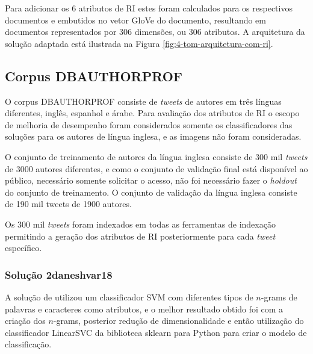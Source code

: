 				

				Para adicionar os 6 atributos de RI estes foram calculados para os respectivos documentos e embutidos no vetor GloVe do documento, resultando em documentos representados por 306 dimensões, ou 306 atributos.
				A arquitetura da solução adaptada está ilustrada na Figura \ref{fig:4-tom-arquitetura-com-ri}.

		\subsection{Corpus DB\underscore{}AUTHORPROF}
			O corpus DB\underscore{}AUTHORPROF consiste de \textit{tweets} de autores em três línguas diferentes, inglês, espanhol e árabe.
			Para avaliação dos atributos de RI o escopo de melhoria de desempenho foram considerados somente os classificadores das soluções para os autores de língua inglesa, e as imagens não foram consideradas.

			O conjunto de treinamento de autores da língua inglesa consiste de 300 mil \textit{tweets} de 3000 autores diferentes, e como o conjunto de validação final está disponível ao público, necessário somente solicitar o acesso, não foi necessário fazer o \textit{holdout} do conjunto de treinamento.
			O conjunto de validação da língua inglesa consiste de 190 mil tweets de 1900 autores.

			Os 300 mil \textit{tweets} foram indexados em todas as ferramentas de indexação permitindo a geração dos atributos de RI posteriormente para cada \textit{tweet} específico.

			\subsubsection{Solução 2\underscore{}daneshvar18}
				A solução de  utilizou um classificador SVM com diferentes tipos de $n$-grams de palavras e caracteres como atributos, e o melhor resultado obtido foi com a criação dos $n$-grams, posterior redução de dimensionalidade e então utilização do classificador LinearSVC da biblioteca sklearn para Python para criar o modelo de classificação.

